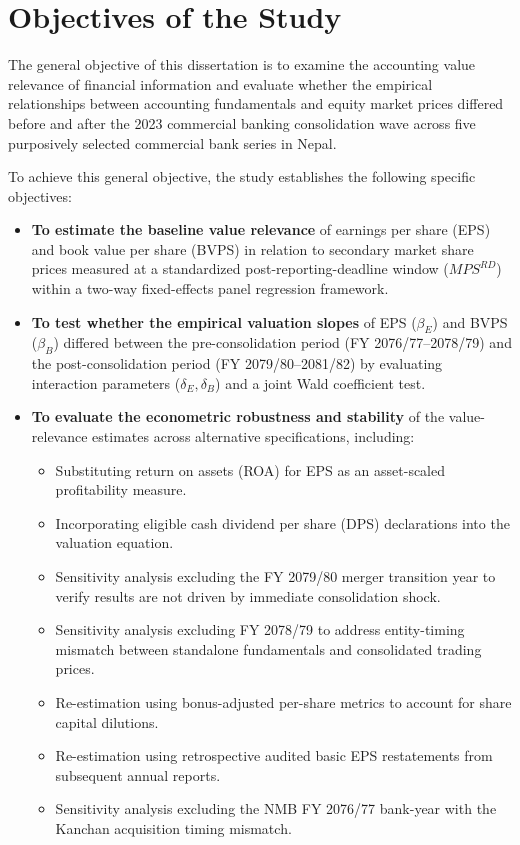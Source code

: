 \section{Objectives of the Study}
\label{sec:objectives}

The general objective of this dissertation is to examine the accounting value relevance of financial information and evaluate whether the empirical relationships between accounting fundamentals and equity market prices differed before and after the 2023 commercial banking consolidation wave across five purposively selected commercial bank series in Nepal.

To achieve this general objective, the study establishes the following specific objectives:
\begin{itemize}
\item \textbf{To estimate the baseline value relevance} of earnings per share (EPS) and book value per share (BVPS) in relation to secondary market share prices measured at a standardized post-reporting-deadline window ($\mathit{MPS}^{RD}$) within a two-way fixed-effects panel regression framework.
\item \textbf{To test whether the empirical valuation slopes} of EPS ($\beta_E$) and BVPS ($\beta_B$) differed between the pre-consolidation period (FY 2076/77--2078/79) and the post-consolidation period (FY 2079/80--2081/82) by evaluating interaction parameters ($\delta_E, \delta_B$) and a joint Wald coefficient test.
\item \textbf{To evaluate the econometric robustness and stability} of the value-relevance estimates across alternative specifications, including:
\begin{itemize}
\item Substituting return on assets (ROA) for EPS as an asset-scaled profitability measure.
\item Incorporating eligible cash dividend per share (DPS) declarations into the valuation equation.
\item Sensitivity analysis excluding the FY 2079/80 merger transition year to verify results are not driven by immediate consolidation shock.
\item Sensitivity analysis excluding FY 2078/79 to address entity-timing mismatch between standalone fundamentals and consolidated trading prices.
\item Re-estimation using bonus-adjusted per-share metrics to account for share capital dilutions.
\item Re-estimation using retrospective audited basic EPS restatements from subsequent annual reports.
\item Sensitivity analysis excluding the NMB FY 2076/77 bank-year with the Kanchan acquisition timing mismatch.
\end{itemize}
\end{itemize}

